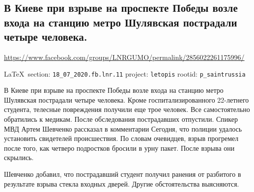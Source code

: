 
 
\subsection{В Киеве при взрыве на проспекте Победы возле входа на станцию метро Шулявская пострадали четыре человека.}
\label{sec:18_07_2020.fb.lnr.11}
\url{https://www.facebook.com/groups/LNRGUMO/permalink/2856022261175996/}
  
\vspace{0.5cm}
{\small\LaTeX~section: \verb|18_07_2020.fb.lnr.11| project: \verb|letopis| rootid: \verb|p_saintrussia|}
\vspace{0.5cm}


В Киеве при взрыве на проспекте Победы возле входа на станцию метро Шулявская
пострадали четыре человека. Кроме госпитализированного 22-летнего студента,
телесные повреждения получили еще трое человек. Все самостоятельно обратились
к медикам. После обследования пострадавших отпустили.  Спикер МВД Артем
Шевченко рассказал в комментарии Сегодня, что полиции удалось установить
свидетелей происшествия. По словам очевидцев, взрыв прогремел после того, как
четверо подростков бросили в урну пакет. После взрыва они скрылись.

Шевченко добавил, что пострадавший студент получил ранения от разбитого в результате взрыва стекла входных дверей. Другие обстоятельства выясняются. 
